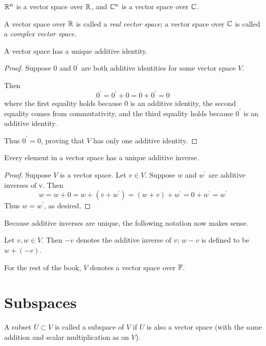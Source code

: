 \begin{example}[$\RR^n$ and $\CC^n$]
$\RR^n$ is a vector space over $\mathbb R$, and $\CC^n$ is a vector space over $\mathbb C$.
\end{example}

A vector space over $\mathbb R$ is called a \emph{real vector space}; a vector space over $\mathbb C$ is called a \emph{complex vector space}.

\begin{proposition}
A vector space has a unique additive identity.
\end{proposition}
\begin{proof}
Suppose $0$ and $0^\prime$ are both additive identities for some vector space $V$.

Then
\[ 0^\prime = 0^\prime + 0 = 0 + 0^\prime = 0 \]
where the first equality holds because $0$ is an additive identity, the second equality comes from commutativity, and the third equality holds because $0^\prime$ is an additive identity. 

Thus $0^\prime = 0$, proving that $V$ has only one additive identity.
\end{proof}

\begin{proposition}
Every element in a vector space has a unique additive inverse.
\end{proposition}
\begin{proof}
Suppose $V$ is a vector space. Let $v \in V$. Suppose $w$ and $w^\prime$ are additive inverses of v. Then
\[ w = w+0 = w+(v+w^\prime) = (w+v)+w^\prime = 0+w^\prime = w^\prime \]
Thus $w=w^\prime$, as desired.
\end{proof}

Because additive inverses are unique, the following notation now makes sense.
\begin{notation}
Let $v,w\in V$. Then $-v$ denotes the additive inverse of $v$; $w-v$ is defined to be $w+(-v)$.
\end{notation}

\begin{notation}
For the rest of the book, $V$ denotes a vector space over $\mathbb F$.
\end{notation}

\section{Subspaces}
\begin{definition}[Subspace]
A subset $U \subset V$ is called a subspace of $V$ if $U$ is also a vector space (with the same addition and scalar multiplication as on $V$).
\end{definition}

